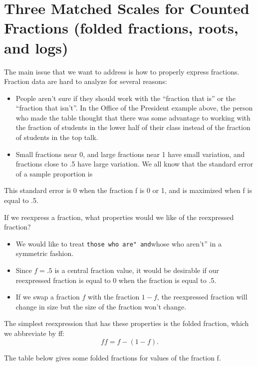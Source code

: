 \documentclass[
]{book}
\providecommand{\tightlist}{%
  \setlength{\itemsep}{0pt}\setlength{\parskip}{0pt}}
\begin{document}
\hypertarget{three-matched-scales-for-counted-fractions-folded-fractions-roots-and-logs}{%
\section{Three Matched Scales for Counted Fractions (folded fractions, roots, and logs)}\label{three-matched-scales-for-counted-fractions-folded-fractions-roots-and-logs}}

The main issue that we want to address is how to properly express fractions. Fraction data are hard to analyze for several reasons:

\begin{itemize}
\tightlist
\item
  People aren't sure if they should work with the ``fraction that is'' or the ``fraction that isn't''. In the Office of the President example above, the person who made the table thought that there was some advantage to working with the fraction of students in the lower half of their class instead of the fraction of students in the top talk.
\item
  Small fractions near 0, and large fractions near 1 have small variation, and fractions close to .5 have large variation. We all know that the standard error of a sample proportion is
\end{itemize}

This standard error is 0 when the fraction f is 0 or 1, and is maximized when f is equal to .5.

If we reexpress a fraction, what properties would we like of the reexpressed fraction?

\begin{itemize}
\tightlist
\item
  We would like to treat \texttt{those\ who\ are"\ and}whose who aren't'' in a symmetric fashion.
\item
  Since \(f = .5\) is a central fraction value, it would be desirable if our reexpressed fraction is equal to 0 when the fraction is equal to .5.
\item
  If we swap a fraction \(f\) with the fraction \(1-f\), the reexpressed fraction will change in size but the size of the fraction won't change.
\end{itemize}

The simplest reexpression that has these properties is the folded fraction, which we abbreviate by ff:
\[
ff = f - (1-f).
\]

The table below gives some folded fractions for values of the fraction f.
\end{document}
